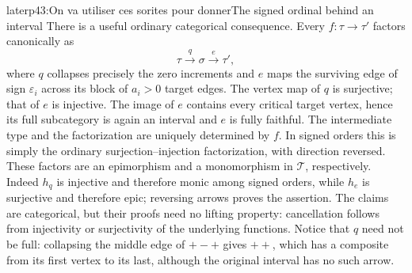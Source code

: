 \begin{dcomment}{later}{p43:On va utiliser ces sorites pour donner}{The signed ordinal behind an interval}
There is a useful ordinary categorical consequence. Every $f:\tau\to\tau'$ factors canonically as
\[
 \tau\xrightarrow{q}\sigma\xrightarrow{e}\tau',
\]
where $q$ collapses precisely the zero increments and $e$ maps the surviving edge of sign $\varepsilon_i$ across its block of $a_i>0$ target edges. The vertex map of $q$ is surjective; that of $e$ is injective. The image of $e$ contains every critical target vertex, hence its full subcategory is again an interval and $e$ is fully faithful. The intermediate type and the factorization are uniquely determined by $f$. In signed orders this is simply the ordinary surjection--injection factorization, with direction reversed. These factors are an epimorphism and a monomorphism in $\mathcal T$, respectively. Indeed $h_q$ is injective and therefore monic among signed orders, while $h_e$ is surjective and therefore epic; reversing arrows proves the assertion. The claims are categorical, but their proofs need no lifting property: cancellation follows from injectivity or surjectivity of the underlying functions. Notice that $q$ need not be full: collapsing the middle edge of $+-+$ gives $++$, which has a composite from its first vertex to its last, although the original interval has no such arrow.
\end{dcomment}

